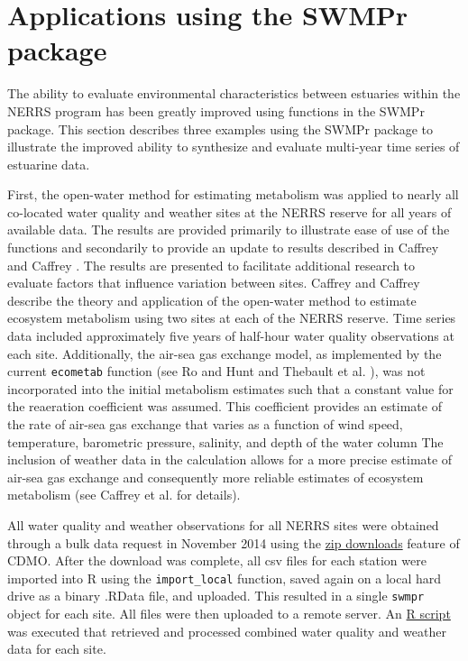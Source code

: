 \documentclass[10pt,letterpaper]{article}\usepackage[]{graphicx}\usepackage[]{color}
\begin{document}
\section*{Applications using the SWMPr package}

The ability to evaluate environmental characteristics between estuaries within the \ac{NERRS} program has been greatly improved using functions in the SWMPr package.  This section describes three examples using the SWMPr package to illustrate the improved ability to synthesize and evaluate multi-year time series of estuarine data.  

First, the open-water method for estimating metabolism was applied to nearly all co-located water quality and weather sites at the \ac{NERRS} reserve for all years of available data.  The results are provided primarily to illustrate ease of use of the functions and secondarily to provide an update to results described in Caffrey \cite{Caffrey03} and Caffrey \cite{Caffrey04}.   The results are presented to facilitate additional research to evaluate factors that influence variation between sites.  Caffrey \cite{Caffrey03} and Caffrey \cite{Caffrey04} describe the theory and application of the open-water method to estimate ecosystem metabolism using two sites at each of the \ac{NERRS} reserve.  Time series data included approximately five years of half-hour water quality observations at each site.  Additionally, the air-sea gas exchange model, as implemented by the current \texttt{ecometab} function (see Ro and Hunt \cite{Ro06} and Thebault et al. \cite{Thebault08}), was not incorporated into the initial metabolism estimates such that a constant value for the reaeration coefficient was assumed.  This coefficient provides an estimate of the rate of air-sea gas exchange that varies as a function of wind speed, temperature, barometric pressure, salinity, and depth of the water column  The inclusion of weather data in the calculation allows for a more precise estimate of air-sea gas exchange and consequently more reliable estimates of ecosystem metabolism (see Caffrey et al. \cite{Caffrey14} for details).

All water quality and weather observations for all \ac{NERRS} sites were obtained through a bulk data request in November 2014 using the \href{http://cdmo.baruch.sc.edu/aqs/zips.cfm}{zip downloads} feature of \ac{CDMO}.  After the download was complete, all csv files for each station were imported into R using the \texttt{import\_local} function, saved again on a local hard drive as a binary .RData file, and uploaded.  This resulted in a single \texttt{swmpr} object for each site.  All files were then uploaded to a remote server.  An \href{https://gist.github.com/fawda123/4fc51c2cb86341ed9291}{R script} was executed that retrieved and processed combined water quality and weather data for each site. 
\end{document}
